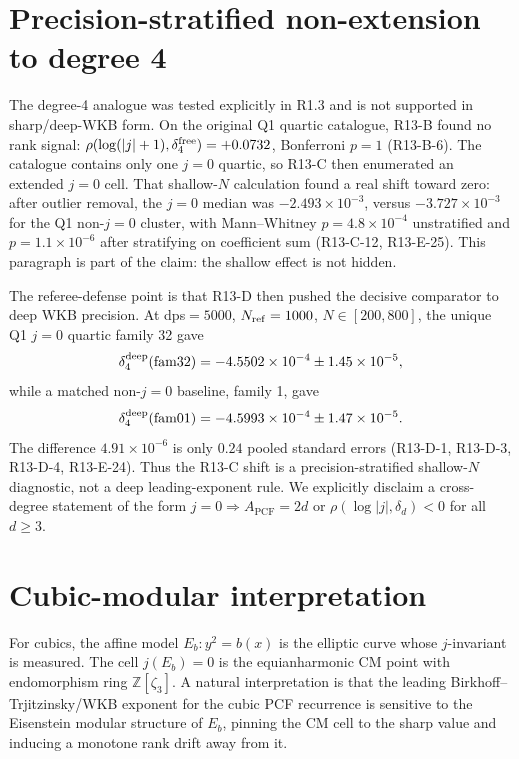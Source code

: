 \documentclass[11pt]{amsart}
\theoremstyle{plain}
\theoremstyle{definition}
\newcommand{\claim}[1]{\textup{\textsf{#1}}}
\newcommand{\PCF}{A_{\mathrm{PCF}}}
\begin{document}
\section{Precision-stratified non-extension to degree 4}

The degree-4 analogue was tested explicitly in R1.3 and is not supported in sharp/deep-WKB form.  On the original Q1 quartic catalogue, R13-B found no rank signal: \(\rho(\log(|j|+1),\delta^{\rm free}_{4})=+0.0732\), Bonferroni \(p=1\) (\claim{R13-B-6}).  The catalogue contains only one \(j=0\) quartic, so R13-C then enumerated an extended \(j=0\) cell.  That shallow-\(N\) calculation found a real shift toward zero: after outlier removal, the \(j=0\) median was \(-2.493\times10^{-3}\), versus \(-3.727\times10^{-3}\) for the Q1 non-\(j=0\) cluster, with Mann--Whitney \(p=4.8\times10^{-4}\) unstratified and \(p=1.1\times10^{-6}\) after stratifying on coefficient sum (\claim{R13-C-12}, \claim{R13-E-25}).  This paragraph is part of the claim: the shallow effect is not hidden.

The referee-defense point is that R13-D then pushed the decisive comparator to deep WKB precision.  At dps\(=5000\), \(N_{\rm ref}=1000\), \(N\in[200,800]\), the unique Q1 \(j=0\) quartic family 32 gave
\[
\delta^{\rm deep}_{4}(\mathrm{fam32})=-4.5502\times10^{-4}\pm1.45\times10^{-5},
\]
while a matched non-\(j=0\) baseline, family 1, gave
\[
\delta^{\rm deep}_{4}(\mathrm{fam01})=-4.5993\times10^{-4}\pm1.47\times10^{-5}.
\]
The difference \(4.91\times10^{-6}\) is only \(0.24\) pooled standard errors (\claim{R13-D-1}, \claim{R13-D-3}, \claim{R13-D-4}, \claim{R13-E-24}).  Thus the R13-C shift is a precision-stratified shallow-\(N\) diagnostic, not a deep leading-exponent rule.  We explicitly disclaim a cross-degree statement of the form \(j=0\Rightarrow \PCF=2d\) or \(\rho(\log|j|,\delta_d)<0\) for all \(d\ge3\).

\section{Cubic-modular interpretation}

For cubics, the affine model \(E_b:y^2=b(x)\) is the elliptic curve whose \(j\)-invariant is measured.  The cell \(j(E_b)=0\) is the equianharmonic CM point with endomorphism ring \(\mathbb Z[\zeta_3]\).  A natural interpretation is that the leading Birkhoff--Trjitzinsky/WKB exponent for the cubic PCF recurrence is sensitive to the Eisenstein modular structure of \(E_b\), pinning the CM cell to the sharp value and inducing a monotone rank drift away from it.
\end{document}
